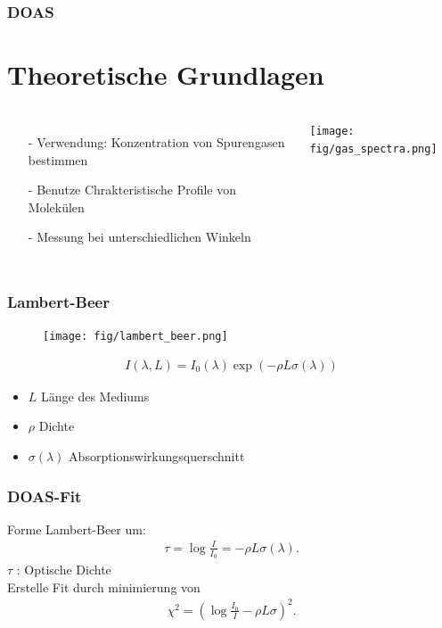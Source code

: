 \documentclass{beamer}
\begin{document}
\begin{frame}
    \frametitle{DOAS}
    \section{Theoretische Grundlagen}
    \begin{columns}
    \begin{itemize}
        \item[-] Verwendung: Konzentration von Spurengasen bestimmen
        \item[-] Benutze Chrakteristische Profile von Molekülen
        \item[-] Messung bei unterschiedlichen Winkeln 
    \end{itemize}
    \begin{minipage}{80mm}
        \texttt{[image: fig/gas\_spectra.png]}
    \end{minipage}
    \end{columns}
\end{frame}

\begin{frame}
    \frametitle{Lambert-Beer}
    \begin{figure}[h]
        \texttt{[image: fig/lambert\_beer.png]}
    \end{figure}
\pause
    \begin{align}
    I(\lambda, L) = I_0 (\lambda) \exp (- \rho  L \sigma (\lambda) )
    \end{align}
    \begin{itemize}
        \item $L$ Länge des Mediums
        \item $\rho$ Dichte
        \item $\sigma (\lambda)$ Absorptionswirkungsquerschnitt %
    \end{itemize}
\end{frame}


\begin{frame}
    \frametitle{DOAS-Fit}
    Forme Lambert-Beer um:
\begin{align}
    \tau = \log \frac{I}{I_0} = - \rho L \sigma (\lambda).
\end{align}
$\tau$ : Optische Dichte\\
Erstelle Fit durch minimierung von
    \begin{align}
        \chi^2 = ( \log \frac{I_0}{I} - \rho L \sigma )^2. 
    \end{align}
\end{frame}
\end{document}

